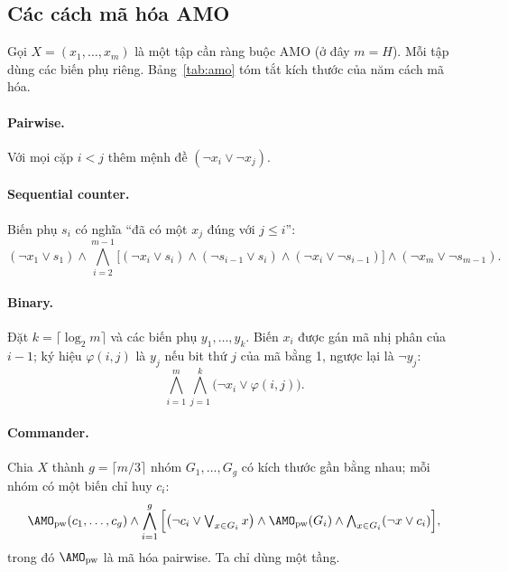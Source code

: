 \subsection{Các cách mã hóa AMO}\label{sec:amo}

Gọi $X=(x_1,\dots,x_m)$ là một tập cần ràng buộc AMO (ở đây $m=H$). Mỗi tập dùng các biến phụ riêng. Bảng~\ref{tab:amo} tóm tắt kích thước của năm cách mã hóa.

\paragraph{Pairwise.} Với mọi cặp $i<j$ thêm mệnh đề $(\neg x_i\vee\neg x_j)$.

\paragraph{Sequential counter.} Biến phụ $s_i$ có nghĩa ``đã có một $x_j$ đúng với $j\le i$'':
\begin{equation}
(\neg x_1\vee s_1)\wedge\bigwedge_{i=2}^{m-1}\big[(\neg x_i\vee s_i)\wedge(\neg s_{i-1}\vee s_i)\wedge(\neg x_i\vee\neg s_{i-1})\big]\wedge(\neg x_m\vee\neg s_{m-1}). \label{eq:seq}
\end{equation}

\paragraph{Binary.} Đặt $k=\lceil\log_2 m\rceil$ và các biến phụ $y_1,\dots,y_k$. Biến $x_i$ được gán mã nhị phân của $i-1$; ký hiệu $\varphi(i,j)$ là $y_j$ nếu bit thứ $j$ của mã bằng 1, ngược lại là $\neg y_j$:
\begin{equation}
\bigwedge_{i=1}^{m}\bigwedge_{j=1}^{k}\big(\neg x_i\vee\varphi(i,j)\big). \label{eq:bin}
\end{equation}

\paragraph{Commander.} Chia $X$ thành $g=\lceil m/3\rceil$ nhóm $G_1,\dots,G_g$ có kích thước gần bằng nhau; mỗi nhóm có một biến chỉ huy $c_i$:
\begin{equation}
\AMO_{\mathrm{pw}}(c_1,\dots,c_g)\wedge\bigwedge_{i=1}^{g}\Big[\big(\neg c_i\vee\textstyle\bigvee_{x\in G_i}x\big)\wedge\AMO_{\mathrm{pw}}(G_i)\wedge\textstyle\bigwedge_{x\in G_i}(\neg x\vee c_i)\Big], \label{eq:cmd}
\end{equation}
trong đó $\AMO_{\mathrm{pw}}$ là mã hóa pairwise. Ta chỉ dùng một tầng.

